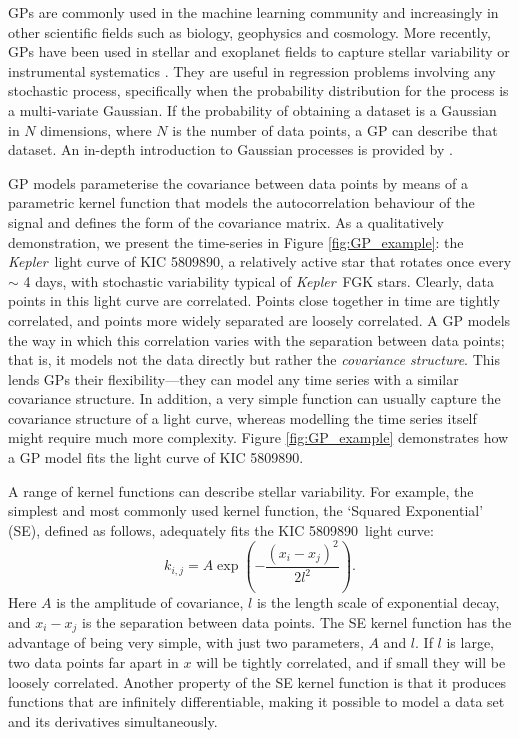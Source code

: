 \documentclass[useAMS, usenatbib, preprint, 12pt]{aastex}
\newcommand{\Kepler}{{\it Kepler}}
\newcommand{\kepler}{\Kepler}
\newcommand{\eg}{{\it e.g.}}
\newcommand{\kepexample}{5809890}
\begin{document}
GPs are commonly used in the machine learning community and increasingly
in other scientific fields such as biology, geophysics and cosmology.
More recently, GPs have been used in stellar and exoplanet fields to capture
stellar variability or instrumental systematics \citep[see \eg][]{Gibson2012,
Haywood2014, Dawson2014, Barclay2015, Haywood2015, Evans2015, Rajpaul2015,
Rajpaul2016, Aigrain2016}.
They are useful in regression problems involving any stochastic process,
specifically when the probability distribution for the process is a
multi-variate Gaussian.
If the probability of obtaining a dataset is a Gaussian in $N$ dimensions,
where $N$ is the number of data points, a GP can describe that dataset.
An in-depth introduction to Gaussian processes is provided by
\citet{Rasmussen2005}.

GP models parameterise the covariance between data points by means of a
parametric kernel function that models the autocorrelation behaviour of the
signal and defines the form of the covariance matrix.
As a qualitatively demonstration, we present the time-series
in Figure \ref{fig:GP_example}:
the \kepler\ light curve of KIC \kepexample, a relatively active star that
rotates once every $\sim$ 4 days, with stochastic variability typical of
\kepler\ FGK stars.
Clearly, data points in this light curve are correlated.
Points close together in time are tightly correlated, and points more
widely separated are loosely correlated.
A GP models the way in which this correlation varies with the separation between
data points; that is, it models not the data directly but rather the {\it
covariance structure}.
This lends GPs their flexibility---they can model any time
series with a similar covariance structure.
In addition, a very simple function can usually capture the covariance
structure of a light curve, whereas modelling the time series itself
might require much more complexity.
Figure \ref{fig:GP_example} demonstrates how a GP model fits the light curve of
KIC \kepexample.

A range of kernel functions can describe stellar variability.
For example, the simplest and most commonly used kernel function, the `Squared
Exponential' (SE), defined as follows, adequately fits the
KIC \kepexample\ light curve:
\begin{equation}
k_{i,j} = A \exp \left(-\frac{(x_i - x_j)^2}{2l^2} \right).
\end{equation}
\label{eq:SE}
Here $A$ is the amplitude of covariance, $l$ is the length scale of
exponential decay, and $x_i-x_j$ is the separation between data points.
The SE kernel function has the advantage of being very simple, with
just two parameters, $A$ and $l$.
If $l$ is large, two data points far apart in $x$ will be tightly correlated,
and if small they will be loosely correlated.
Another property of the SE kernel function is that it produces functions that
are infinitely differentiable, making it possible to model a data set
and its derivatives simultaneously.
\end{document}
